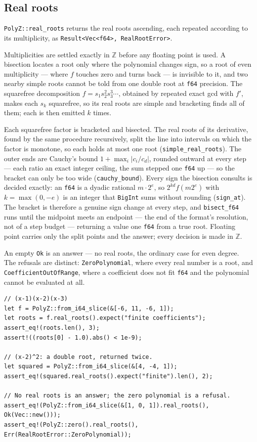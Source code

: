 \documentclass[11pt]{article}
\newcommand{\code}[1]{\texttt{#1}}
\newcommand{\Z}{\mathbb{Z}}
\begin{document}
\subsection{Real roots}

\code{PolyZ::real\_roots} returns the real roots ascending, each repeated
according to its multiplicity, as
\code{Result<Vec<f64>, RealRootError>}.

Multiplicities are settled exactly in $\Z$ before any floating point is used.
A bisection locates a root only where the polynomial changes sign, so a root
of even multiplicity --- where $f$ touches zero and turns back --- is
invisible to it, and two nearby simple roots cannot be told from one double
root at \code{f64} precision. The squarefree decomposition
$f = s_1 s_2^2 s_3^3 \cdots$, obtained by repeated exact gcd with $f'$, makes
each $s_k$ squarefree, so its real roots are simple and bracketing finds all
of them; each is then emitted $k$ times.

Each squarefree factor is bracketed and bisected. The real roots of its
derivative, found by the same procedure recursively, split the line into
intervals on which the factor is monotone, so each holds at most one root
(\code{simple\_real\_roots}). The outer ends are Cauchy's bound
$1 + \max_i |c_i / c_d|$, rounded outward at every step --- each ratio an
exact integer ceiling, the sum stepped one \code{f64} up --- so the bracket
can only be too wide (\code{cauchy\_bound}). Every sign the bisection
consults is decided exactly: an \code{f64} is a dyadic rational
$m \cdot 2^{e}$, so $2^{kd} f(m 2^{e})$ with $k = \max(0, -e)$ is an
integer that \code{BigInt} sums without rounding (\code{sign\_at}). The
bracket is therefore a genuine sign change at every step, and
\code{bisect\_f64} runs until the midpoint meets an endpoint --- the end of
the format's resolution, not of a step budget --- returning a value one
\code{f64} from a true root. Floating point carries only the split points
and the answer; every decision is made in $\Z$.

An empty \code{Ok} is an answer --- no real roots, the ordinary case for even
degree. The refusals are distinct: \code{ZeroPolynomial}, where every real
number is a root, and \code{CoefficientOutOfRange}, where a coefficient does
not fit \code{f64} and the polynomial cannot be evaluated at all.

\begin{lstlisting}
// (x-1)(x-2)(x-3)
let f = PolyZ::from_i64_slice(&[-6, 11, -6, 1]);
let roots = f.real_roots().expect("finite coefficients");
assert_eq!(roots.len(), 3);
assert!((roots[0] - 1.0).abs() < 1e-9);

// (x-2)^2: a double root, returned twice.
let squared = PolyZ::from_i64_slice(&[4, -4, 1]);
assert_eq!(squared.real_roots().expect("finite").len(), 2);

// No real roots is an answer; the zero polynomial is a refusal.
assert_eq!(PolyZ::from_i64_slice(&[1, 0, 1]).real_roots(), Ok(Vec::new()));
assert_eq!(PolyZ::zero().real_roots(), Err(RealRootError::ZeroPolynomial));
\end{lstlisting}
\end{document}
